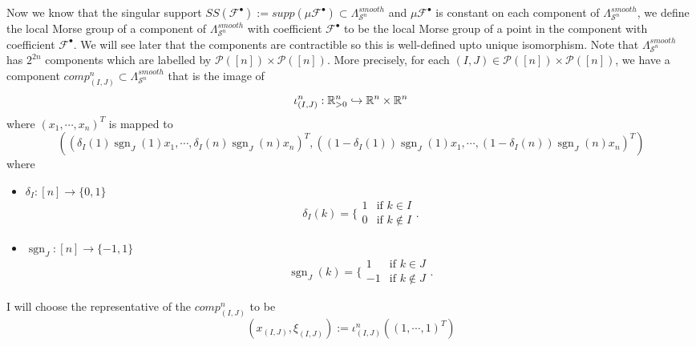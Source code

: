 Now we know that the singular support $SS(\mathscr{F}^\bullet):= supp(\mu \mathscr{F}^\bullet) \subset \Lambda_{\mathcal{S}^n}^{smooth}$ and $\mu\mathcal{F}^\bullet$ is constant on each component of $\Lambda_{
\mathcal{S}^n}^{smooth}$, we define the local Morse group of a component of $\Lambda_{\mathcal{S}^n}^{smooth}$ with coefficient $\mathscr{F}^\bullet$ to be the local Morse group of a point in the component with coefficient $\mathscr{F}^\bullet$. We will see later that the components are contractible so this is well-defined upto unique isomorphism.
Note that $\Lambda_{\mathcal{S}^n}^{smooth}$ has $2^{2n}$ components which are labelled by $\mathcal{P}([n])\times \mathcal{P}([n])$. More precisely, for each $(I,J)\in \mathcal{P}([n])\times \mathcal{P}([n])$, we have a component $comp^n_{(I,J)}\subset \Lambda_{\mathcal{S}^n}^{smooth}$ that is the image of 
\[
\iota^n_{(I,J)}:\mathbb{R}^n_{>0} \hookrightarrow \mathbb{R}^n\times \mathbb{R}^n
\]
where $(x_1,\cdots,x_n)^T$ is mapped to 
\[((\delta_I(1)\operatorname{sgn}_J(1)x_1,\cdots,\delta_I(n)\operatorname{sgn}_J(n)x_n)^T,((1-\delta_I(1))\operatorname{sgn}_J(1)x_1,\cdots,(1-\delta_I(n))\operatorname{sgn}_J(n)x_n)^T)
\]
where
\begin{itemize}
\item $\delta_I : [n] \rightarrow \{0,1\}$
\[\delta_I(k)=\bigg\{
\begin{array}{ll}
    1 & \text{if } k\in I \\
    0 & \text{if } k\not\in I
\end{array}
\bigg.
\]

\item $\operatorname{sgn}_J : [n] \rightarrow \{-1,1\}$
\[\operatorname{sgn}_J(k)=\bigg\{
\begin{array}{ll}
    1 & \text{if } k\in J \\
    -1 & \text{if } k\not\in J
\end{array}
\bigg.
\]
\end{itemize}

I will choose the representative of the $comp^n_{(I,J)}$ to be 
\[
(x_{(I,J)},\xi_{(I,J)}) := \iota^n_{(I,J)}((1,\cdots,1)^T)
\]

